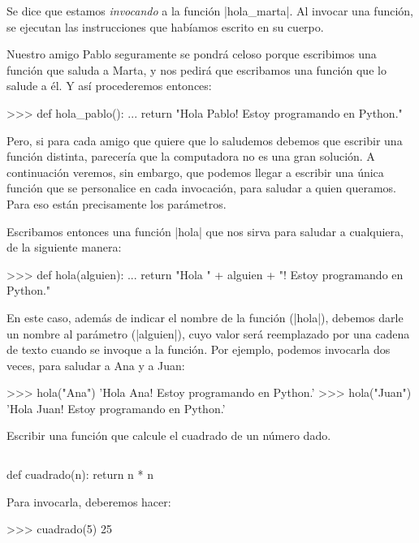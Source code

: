 Se dice que estamos \emph{invocando} a la función |hola_marta|.  Al invocar una
función, se ejecutan las instrucciones que habíamos escrito en su cuerpo.

Nuestro amigo Pablo seguramente se pondrá celoso porque escribimos
una función que saluda a Marta, y nos pedirá que escribamos una
función que lo salude a él. Y así procederemos entonces:

\begin{codigo-python-sn}
>>> def hola_pablo():
...     return "Hola Pablo! Estoy programando en Python."
\end{codigo-python-sn}

Pero, si para cada amigo que quiere que lo saludemos debemos que
escribir una función distinta, parecería que la computadora no es
una gran solución. A continuación veremos, sin embargo, que
podemos llegar a escribir una única función que se personalice en
cada invocación, para saludar a quien queramos. Para eso están
precisamente los parámetros.

Escribamos entonces una función |hola| que nos sirva para saludar a
cualquiera, de la siguiente manera:

\begin{codigo-python-sn}
>>> def hola(alguien):
...     return "Hola " + alguien + "! Estoy programando en Python."
\end{codigo-python-sn}

En este caso, además de indicar el nombre de la función (|hola|), debemos darle
un nombre al parámetro (|alguien|), cuyo valor será reemplazado por una cadena
de texto cuando se invoque a la función. Por ejemplo, podemos invocarla dos
veces, para saludar a Ana y a Juan:

\begin{codigo-python-sn}
>>> hola("Ana")
'Hola Ana! Estoy programando en Python.'
>>> hola("Juan")
'Hola Juan! Estoy programando en Python.'
\end{codigo-python-sn}

\begin{problema}
\label{cuadrado}
Escribir una función que calcule el cuadrado de un número dado.
\end{problema}

\begin{solucion}
$ $\par
\begin{codigo-python-sn}
def cuadrado(n):
    return n * n
\end{codigo-python-sn}

Para invocarla, deberemos hacer:
\begin{codigo-python-sn}
>>> cuadrado(5)
25
\end{codigo-python-sn}
\end{solucion}


